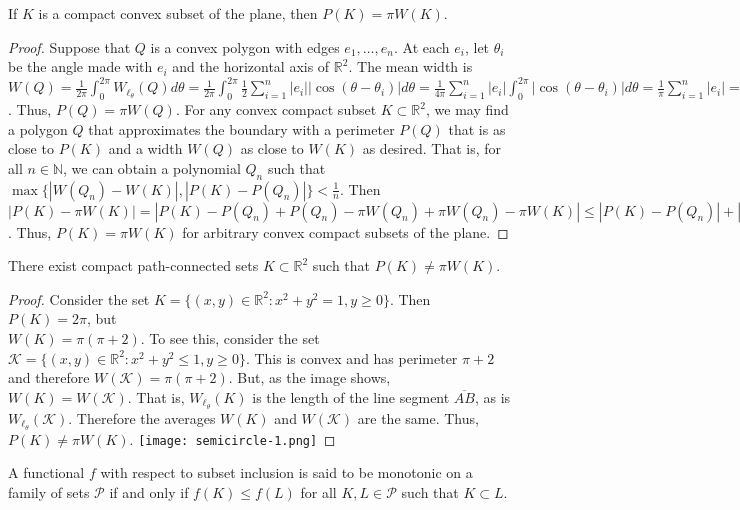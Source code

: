 \documentclass[crop=false,class=article,oneside]{standalone}
\begin{document}
        \begin{theorem}
        If $K$ is a compact convex subset of the plane, then $P(K) = \pi W(K)$.
        \end{theorem}
        \begin{proof}
        Suppose that $Q$ is a convex polygon with edges $e_1,\hdots, e_n$. At each $e_i$, let $\theta_i$ be the angle made with $e_i$ and the horizontal axis of $\mathbb{R}^2$. The mean width is $W(Q) = \frac{1}{2\pi}\int_{0}^{2\pi} W_{\ell_\theta}(Q)d\theta = \frac{1}{2\pi} \int_{0}^{2\pi} \frac{1}{2} \sum_{i=1}^{n} |e_i||\cos(\theta-\theta_i)|d\theta = \frac{1}{4\pi}\sum_{i=1}^{n} |e_i|\int_{0}^{2\pi} |\cos(\theta-\theta_i)|d\theta = \frac{1}{\pi} \sum_{i=1}^{n} |e_i| = \frac{1}{\pi} P(Q)$. Thus, $P(Q) = \pi W(Q)$. For any convex compact subset $K\subset \mathbb{R}^2$, we may find a polygon $Q$ that approximates the boundary with a perimeter $P(Q)$ that is as close to $P(K)$ and a width $W(Q)$ as close to $W(K)$ as desired. That is, for all $n\in \mathbb{N}$, we can obtain a polynomial $Q_n$ such that $\max\{|W(Q_n)-W(K)|,|P(K)-P(Q_n)|\}< \frac{1}{n}$. Then $|P(K)-\pi W(K)| = |P(K) - P(Q_n)+P(Q_n)-\pi W(Q_n)+\pi W(Q_n)-\pi W(K)| \leq |P(K)-P(Q_n)|+|P(Q_n)-\pi W(Q_n)|+\pi|W(Q_n)-W(K)| < \frac{1}{n} + 0 + \frac{\pi}{n} = \frac{1+\pi}{n} \rightarrow 0$. Thus, $P(K) = \pi W(K)$ for arbitrary convex compact subsets of the plane.
        \end{proof}
        \begin{theorem}
        There exist compact path-connected sets $K\subset \mathbb{R}^2$ such that $P(K) \ne \pi W(K)$.
        \end{theorem}
        \begin{proof}
        Consider the set $K = \{(x,y) \in \mathbb{R}^2: x^2+y^2=1, y\geq 0\}$. Then $P(K) = 2\pi$, but \\ $W(K) = \pi(\pi+2)$. To see this, consider the set $\mathcal{K} = \{(x,y)\in \mathbb{R}^2: x^2 + y^2 \leq 1, y\geq 0\}$. This is convex and has perimeter $\pi+2$ and therefore $W(\mathcal{K}) = \pi(\pi+2)$. But, as the image shows, $W(K) = W(\mathcal{K})$. That is, $W_{\ell_{\theta}}(K)$ is the length of the line segment $\overline{AB}$, as is $W_{\ell_{\theta}}(\mathcal{K})$. Therefore the averages $W(K)$ and $W(\mathcal{K})$ are the same. Thus, $P(K) \ne \pi W(K)$.
        \texttt{[image: semicircle-1.png]}
        \end{proof}
        \begin{definition}
        A functional $f$ with respect to subset inclusion is said to be monotonic on a family of sets $\mathscr{P}$ if and only if $f(K)\leq f(L)$ for all $K,L \in \mathscr{P}$ such that $K\subset L$.
        \end{definition}
\end{document}
